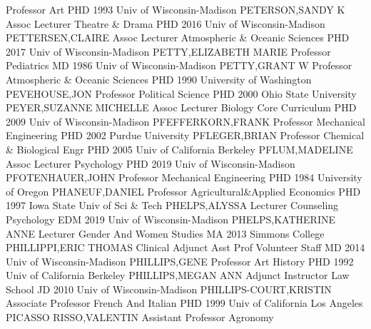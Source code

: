 \documentclass[
]{article}
\begin{document}
\textbar Professor \textbar Art \textbar PHD 1993 Univ of
Wisconsin-Madison \textbar{}  \textbar PETERSON,SANDY K
\textbar Assoc Lecturer \textbar Theatre \& Drama \textbar PHD 2016 Univ
of Wisconsin-Madison \textbar{}  \textbar PETTERSEN,CLAIRE
\textbar Assoc Lecturer \textbar Atmospheric \& Oceanic Sciences
\textbar PHD 2017 Univ of Wisconsin-Madison \textbar{} 
\textbar PETTY,ELIZABETH MARIE \textbar Professor \textbar Pediatrics
\textbar MD 1986 Univ of Wisconsin-Madison \textbar{} 
\textbar PETTY,GRANT W \textbar Professor \textbar Atmospheric \&
Oceanic Sciences \textbar PHD 1990 University of Washington \textbar{}
 \textbar PEVEHOUSE,JON \textbar Professor
\textbar Political Science \textbar PHD 2000 Ohio State University
\textbar{}  \textbar PEYER,SUZANNE MICHELLE \textbar Assoc
Lecturer \textbar Biology Core Curriculum \textbar PHD 2009 Univ of
Wisconsin-Madison \textbar{}  \textbar PFEFFERKORN,FRANK
\textbar Professor \textbar Mechanical Engineering \textbar PHD 2002
Purdue University \textbar{}  \textbar PFLEGER,BRIAN
\textbar Professor \textbar Chemical \& Biological Engr \textbar PHD
2005 Univ of California Berkeley \textbar{} 
\textbar PFLUM,MADELINE \textbar Assoc Lecturer \textbar Psychology
\textbar PHD 2019 Univ of Wisconsin-Madison \textbar{} 
\textbar PFOTENHAUER,JOHN \textbar Professor \textbar Mechanical
Engineering \textbar PHD 1984 University of Oregon \textbar{}
 \textbar PHANEUF,DANIEL \textbar Professor
\textbar Agricultural\&Applied Economics \textbar PHD 1997 Iowa State
Univ of Sci \& Tech \textbar{}  \textbar PHELPS,ALYSSA
\textbar Lecturer \textbar Counseling Psychology \textbar EDM 2019 Univ
of Wisconsin-Madison \textbar{}  \textbar PHELPS,KATHERINE
ANNE \textbar Lecturer \textbar Gender And Women Studies \textbar MA
2013 Simmons College \textbar{}  \textbar PHILLIPPI,ERIC
THOMAS \textbar Clinical Adjunct Asst Prof \textbar Volunteer Staff
\textbar MD 2014 Univ of Wisconsin-Madison \textbar{} 
\textbar PHILLIPS,GENE \textbar Professor \textbar Art History
\textbar PHD 1992 Univ of California Berkeley \textbar{} 
\textbar PHILLIPS,MEGAN ANN \textbar Adjunct Instructor \textbar Law
School \textbar JD 2010 Univ of Wisconsin-Madison \textbar{}
 \textbar PHILLIPS-COURT,KRISTIN \textbar Associate
Professor \textbar French And Italian \textbar PHD 1999 Univ of
California Los Angeles \textbar{}  \textbar PICASSO
RISSO,VALENTIN \textbar Assistant Professor \textbar Agronomy
\end{document}
